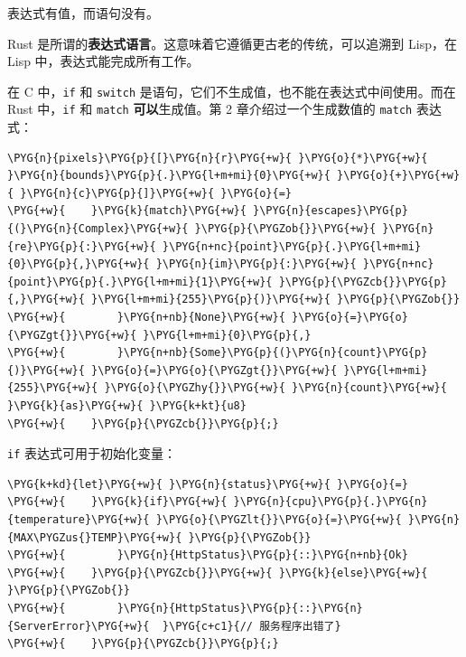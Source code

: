 表达式有值，而语句没有。

Rust 是所谓的\textbf{表达式语言}。这意味着它遵循更古老的传统，可以追溯到 Lisp，在 Lisp 中，表达式能完成所有工作。

在 C 中，\texttt{if} 和 \texttt{switch} 是语句，它们不生成值，也不能在表达式中间使用。而在 Rust 中，\texttt{if} 和 \texttt{match} \textbf{可以}生成值。第 2 章介绍过一个生成数值的 \texttt{match} 表达式：

\begin{Verbatim}[commandchars=\\\{\},breaklines=true,breakanywhere=true,fontsize=\codefont,xleftmargin=17bp]
\PYG{n}{pixels}\PYG{p}{[}\PYG{n}{r}\PYG{+w}{ }\PYG{o}{*}\PYG{+w}{ }\PYG{n}{bounds}\PYG{p}{.}\PYG{l+m+mi}{0}\PYG{+w}{ }\PYG{o}{+}\PYG{+w}{ }\PYG{n}{c}\PYG{p}{]}\PYG{+w}{ }\PYG{o}{=}
\PYG{+w}{    }\PYG{k}{match}\PYG{+w}{ }\PYG{n}{escapes}\PYG{p}{(}\PYG{n}{Complex}\PYG{+w}{ }\PYG{p}{\PYGZob{}}\PYG{+w}{ }\PYG{n}{re}\PYG{p}{:}\PYG{+w}{ }\PYG{n+nc}{point}\PYG{p}{.}\PYG{l+m+mi}{0}\PYG{p}{,}\PYG{+w}{ }\PYG{n}{im}\PYG{p}{:}\PYG{+w}{ }\PYG{n+nc}{point}\PYG{p}{.}\PYG{l+m+mi}{1}\PYG{+w}{ }\PYG{p}{\PYGZcb{}}\PYG{p}{,}\PYG{+w}{ }\PYG{l+m+mi}{255}\PYG{p}{)}\PYG{+w}{ }\PYG{p}{\PYGZob{}}
\PYG{+w}{        }\PYG{n+nb}{None}\PYG{+w}{ }\PYG{o}{=}\PYG{o}{\PYGZgt{}}\PYG{+w}{ }\PYG{l+m+mi}{0}\PYG{p}{,}
\PYG{+w}{        }\PYG{n+nb}{Some}\PYG{p}{(}\PYG{n}{count}\PYG{p}{)}\PYG{+w}{ }\PYG{o}{=}\PYG{o}{\PYGZgt{}}\PYG{+w}{ }\PYG{l+m+mi}{255}\PYG{+w}{ }\PYG{o}{\PYGZhy{}}\PYG{+w}{ }\PYG{n}{count}\PYG{+w}{ }\PYG{k}{as}\PYG{+w}{ }\PYG{k+kt}{u8}
\PYG{+w}{    }\PYG{p}{\PYGZcb{}}\PYG{p}{;}
\end{Verbatim}

\texttt{if} 表达式可用于初始化变量：

\begin{Verbatim}[commandchars=\\\{\},breaklines=true,breakanywhere=true,fontsize=\codefont,xleftmargin=17bp]
\PYG{k+kd}{let}\PYG{+w}{ }\PYG{n}{status}\PYG{+w}{ }\PYG{o}{=}
\PYG{+w}{    }\PYG{k}{if}\PYG{+w}{ }\PYG{n}{cpu}\PYG{p}{.}\PYG{n}{temperature}\PYG{+w}{ }\PYG{o}{\PYGZlt{}}\PYG{o}{=}\PYG{+w}{ }\PYG{n}{MAX\PYGZus{}TEMP}\PYG{+w}{ }\PYG{p}{\PYGZob{}}
\PYG{+w}{        }\PYG{n}{HttpStatus}\PYG{p}{::}\PYG{n+nb}{Ok}
\PYG{+w}{    }\PYG{p}{\PYGZcb{}}\PYG{+w}{ }\PYG{k}{else}\PYG{+w}{ }\PYG{p}{\PYGZob{}}
\PYG{+w}{        }\PYG{n}{HttpStatus}\PYG{p}{::}\PYG{n}{ServerError}\PYG{+w}{  }\PYG{c+c1}{// 服务程序出错了}
\PYG{+w}{    }\PYG{p}{\PYGZcb{}}\PYG{p}{;}
\end{Verbatim}

